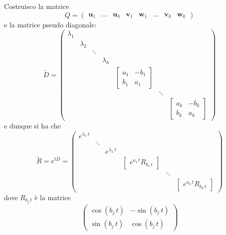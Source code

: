 {    Costruisco la matrice \[
        Q=\begin{pmatrix}
            \bm{u}_1 & \dots & \bm{u}_h & \bm{v}_1 & \bm{w}_1 & \dots & \bm{v}_k & \bm{w}_k 
        \end{pmatrix}
    \]e la matrice pseudo diagonale: \[
        \tilde{D}=\begin{pmatrix}
            \lambda_1\\ 
            & \lambda_2\\ 
            & & \ddots\\ 
            & & & \lambda_{h}\\ 
            & & & & \begin{bmatrix}
                a_1 & -b_1\\ 
                b_1 & a_1
            \end{bmatrix}\\
            & & & & &\ddots\\ 
            & & & & & &\begin{bmatrix}
                a_k & -b_k\\ 
                b_k & a_k
            \end{bmatrix}
        \end{pmatrix}
    \]e dunque si ha che \[
        \tilde{R}=e^{t\tilde{D}}=\begin{pmatrix}
            e^{\lambda_1\,t}\\ 
            & \ddots\\ 
            & & e^{\lambda_h\,t}\\ 
            & & &\begin{bmatrix}
                e^{a_1\,t}R_{b_1\,t} 
            \end{bmatrix}\\ 
            & & & &\ddots\\ 
            & & & & &\begin{bmatrix}
                e^{a_k\,t}R_{b_k\,t} 
            \end{bmatrix}
        \end{pmatrix}
    \]dove $ R_{b_{j}\,t }$ è la matrice \[
        \begin{pmatrix}
            \cos(b_j\,t) & -\sin(b_j\,t)\\ 
            \sin(b_j\,t) & \cos(b_j\,t)
        \end{pmatrix}
    \]
}{}{}
